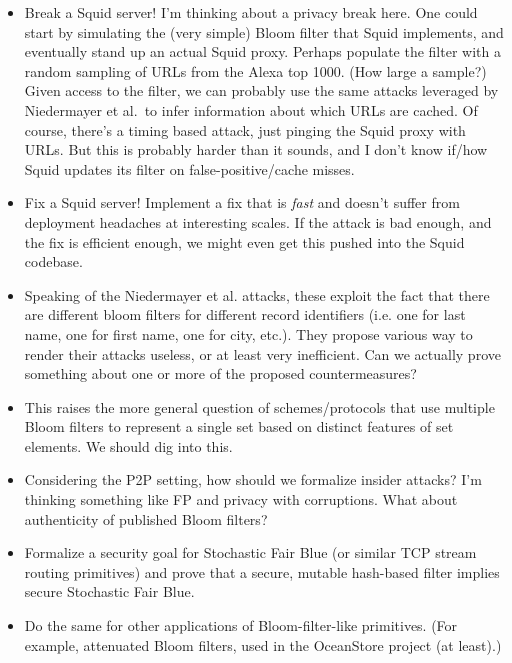 \begin{itemize}
\item Break a Squid server!  I'm thinking about a privacy break here.  One could start by simulating the (very simple) Bloom filter that Squid implements, and eventually stand up an actual Squid proxy.  Perhaps populate the filter with a random sampling of URLs from the Alexa top 1000.  (How large a sample?)  Given access to the filter, we can probably use the same attacks leveraged by Niedermayer et al.\ to infer information about which URLs are cached.  Of course, there's a timing based attack, just pinging the Squid proxy with URLs.   But this is probably harder than it sounds, and I don't know if/how Squid updates its filter on false-positive/cache misses. 

\item Fix a Squid server!  Implement a fix that is \emph{fast} and doesn't suffer from deployment headaches at interesting scales.  If the attack is bad enough, and the fix is efficient enough, we might even get this pushed into the Squid codebase. 

\item Speaking of the Niedermayer et al. attacks, these exploit the fact that there are different bloom filters for different record identifiers (i.e. one for last name, one for first name, one for city, etc.).  They propose various way to render their attacks useless, or at least very inefficient.  Can we actually prove something about one or more of the proposed countermeasures?  

\item This raises the more general question of schemes/protocols that use multiple Bloom filters to represent a single set based on distinct features of set elements.  We should dig into this.

\item Considering the P2P setting, how should we formalize insider attacks?  I'm thinking something like FP and privacy with corruptions.  What about authenticity of published Bloom filters?

\item Formalize a security goal for Stochastic Fair Blue (or similar TCP stream routing primitives) and prove that a secure, mutable hash-based filter implies secure Stochastic Fair Blue.

\item Do the same for other applications of Bloom-filter-like primitives.  (For example, attenuated Bloom filters, used in the OceanStore project (at least).)


\end{itemize}
